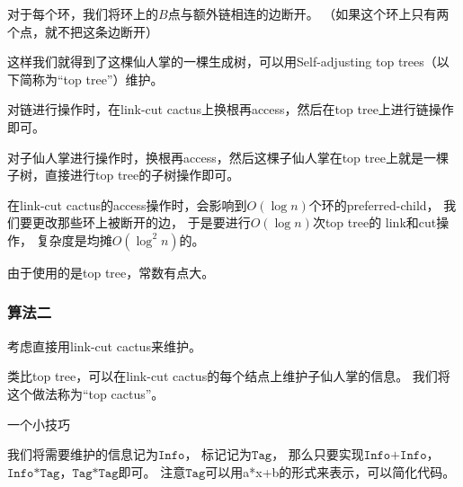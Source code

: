 \documentclass{noithesis}
\begin{document}
对于每个环，我们将环上的$B$点与额外链相连的边断开。
（如果这个环上只有两个点，就不把这条边断开）

这样我们就得到了这棵仙人掌的一棵生成树，可以用Self-adjusting top trees（以下简称为``top tree''）维护。

对链进行操作时，在link-cut cactus上换根再access，然后在top tree上进行链操作即可。

对子仙人掌进行操作时，换根再access，然后这棵子仙人掌在top tree上就是一棵子树，直接进行top tree的子树操作即可。

在link-cut cactus的access操作时，会影响到$O(\log n)$个环的preferred-child，
我们要更改那些环上被断开的边，
于是要进行$O(\log n)$次top tree的
link和cut操作，
复杂度是均摊$O(\log ^ 2 n)$的。

由于使用的是top tree，常数有点大。


\subsubsection{算法二}

考虑直接用link-cut cactus来维护。

类比top tree，可以在link-cut cactus的每个结点上维护子仙人掌的信息。
我们将这个做法称为``top cactus''。

$\textbf{一个小技巧}$

我们将需要维护的信息记为$\texttt{Info}$，
标记记为$\texttt{Tag}$，
那么只要实现$\texttt{Info+Info}$，$\texttt{Info*Tag}$，$\texttt{Tag*Tag}$即可。
注意$\texttt{Tag}$可以用a*x+b的形式来表示，可以简化代码。

\text{}
\end{document}
